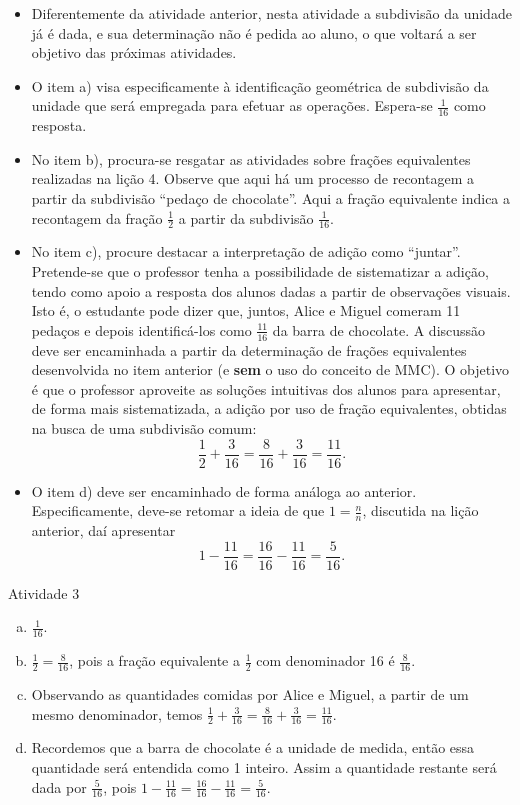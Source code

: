 \begin{multicols}{2}
 \vspace{.15cm}

\begin{itemize} %
  \item      Diferentemente da atividade anterior, nesta atividade a subdivisão da unidade já é dada, e sua determinação não é pedida ao aluno, o que voltará a ser objetivo das próximas atividades.
  \item      O item a) visa especificamente à identificação geométrica de subdivisão da unidade que será empregada para efetuar as operações. Espera-se     $\frac{1}{16}$     como resposta.
  \item     No item b), procura-se resgatar as atividades sobre frações equivalentes realizadas na lição 4. Observe que aqui há um processo de recontagem a partir da subdivisão ``pedaço de chocolate''. Aqui a fração equivalente indica a recontagem da fração $\frac{1}{2}$ a partir da subdivisão $\frac{1}{16}$.
  \item  No item c), procure destacar a interpretação de adição como ``juntar''. Pretende-se que o professor tenha a possibilidade de sistematizar a adição, tendo como apoio a resposta dos alunos dadas a partir de observações visuais. Isto é, o estudante pode dizer que, juntos, Alice e Miguel comeram 11 pedaços e depois identificá-los como $\frac{11}{16}$ da barra de chocolate. A discussão deve ser encaminhada a partir da determinação de frações equivalentes desenvolvida no item anterior (e {\bf sem} o uso do conceito de MMC). O objetivo é que o professor aproveite as soluções intuitivas dos alunos para apresentar, de forma mais sistematizada, a adição por uso de fração equivalentes, obtidas na busca de uma subdivisão comum:
$$\frac{1}{2} + \frac{3}{16} = \frac{8}{16} + \frac{3}{16} = \frac{11}{16}.$$
  \item  O item d) deve ser encaminhado de forma análoga ao anterior. Especificamente, deve-se retomar a ideia de que $1 = \frac{n}{n}$, discutida na lição anterior, daí apresentar $$1 - \frac{11}{16} =  \frac{16}{16} - \frac{11}{16} = \frac{5}{16}.$$
\end{itemize} %

  \begin{resposta*}{Atividade 3}
    \begin{enumerate}[a)]
     \item $\frac{1}{16}$.
     \item $\frac{1}{2}=\frac{8}{16}$, pois a fração equivalente a $\frac{1}{2}$ com denominador 16 é $\frac{8}{16}$.
     \item Observando as quantidades comidas por Alice e Miguel, a partir de um mesmo denominador, temos $\frac{1}{2}+\frac{3}{16} = \frac{8}{16} + \frac{3}{16} = \frac{11}{16}$.
     \item Recordemos que a barra de chocolate é a unidade de medida, então essa quantidade será entendida como 1 inteiro. Assim a quantidade restante será dada por $\frac{5}{16}$, pois $1 - \frac{11}{16} = \frac{16}{16} - \frac{11}{16} = \frac{5}{16}$.
    \end{enumerate}
  \end{resposta*}


\end{multicols}
